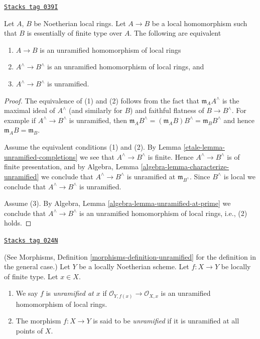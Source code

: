 \begin{lemma}
\label{etale-lemma-characterize-unramified-completions}
\href{https://stacks.math.columbia.edu/tag/039I}{\texttt{Stacks tag 039I}}

Let $A$, $B$ be Noetherian local rings.
Let $A \to B$ be a local homomorphism such that $B$ is
essentially of finite type over $A$.
The following are equivalent
\begin{enumerate}
\item $A \to B$ is an unramified homomorphism of local rings
\item $A^\wedge \to B^\wedge$ is an unramified homomorphism of local rings, and
\item $A^\wedge \to B^\wedge$ is unramified.
\end{enumerate}
\end{lemma}

\begin{proof}

The equivalence of (1) and (2) follows from the fact that
$\mathfrak m_AA^\wedge$ is the maximal ideal of $A^\wedge$
(and similarly for $B$) and faithful flatness of $B \to B^\wedge$.
For example if $A^\wedge \to B^\wedge$ is unramified, then
$\mathfrak m_AB^\wedge = (\mathfrak m_AB)B^\wedge = \mathfrak m_BB^\wedge$
and hence $\mathfrak m_AB = \mathfrak m_B$.

\medskip\noindent
Assume the equivalent conditions (1) and (2).
By Lemma \ref{etale-lemma-unramified-completions}
we see that $A^\wedge \to B^\wedge$ is
finite. Hence $A^\wedge \to B^\wedge$ is of finite presentation, and by
Algebra, Lemma \ref{algebra-lemma-characterize-unramified}
we conclude that $A^\wedge \to B^\wedge$ is unramified at
$\mathfrak m_{B^\wedge}$. Since $B^\wedge$ is local we conclude
that $A^\wedge \to B^\wedge$ is unramified.

\medskip\noindent
Assume (3). By Algebra, Lemma \ref{algebra-lemma-unramified-at-prime}
we conclude that $A^\wedge \to B^\wedge$ is an unramified homomorphism
of local rings, i.e., (2) holds.
\end{proof}

\begin{definition}
\label{etale-definition-unramified-schemes}
\href{https://stacks.math.columbia.edu/tag/024N}{\texttt{Stacks tag 024N}}

(See Morphisms, Definition \ref{morphisms-definition-unramified}
for the definition in the general case.)
Let $Y$ be a locally Noetherian scheme.
Let $f : X \to Y$ be locally of finite type.
Let $x \in X$.
\begin{enumerate}
\item We say $f$ is {\it unramified at $x$} if
$\mathcal{O}_{Y, f(x)} \to \mathcal{O}_{X, x}$
is an unramified homomorphism of local rings.
\item The morphism $f : X \to Y$ is said to be {\it unramified}
if it is unramified at all points of $X$.
\end{enumerate}
\end{definition}

